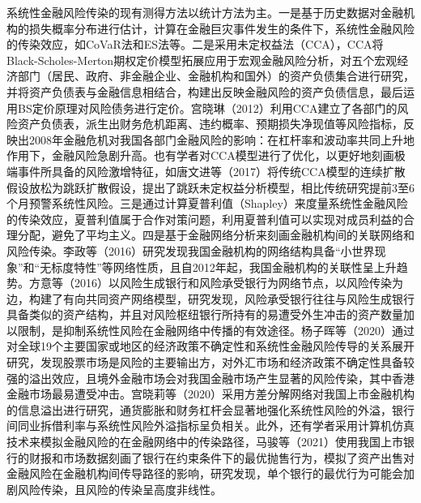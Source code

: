 \documentclass[lang=cn]{elegantpaper}
\begin{document}
系统性金融风险传染的现有测得方法以统计方法为主。一是基于历史数据对金融机构的损失概率分布进行估计，计算在金融巨灾事件发生的条件下，系统性金融风险的传染效应，如CoVaR法和ES法等。二是采用未定权益法（CCA），CCA将Black-Scholes-Merton期权定价模型拓展应用于宏观金融风险分析，对五个宏观经济部门（居民、政府、非金融企业、金融机构和国外）的资产负债集合进行研究，并将资产负债表与金融信息相结合，构建出反映金融风险的资产负债信息，最后运用BS定价原理对风险债务进行定价。宫晓琳（2012）\cite{12}利用CCA建立了各部门的风险资产负债表，派生出财务危机距离、违约概率、预期损失净现值等风险指标，反映出2008年金融危机对我国各部门金融风险的影响：在杠杆率和波动率共同上升地作用下，金融风险急剧升高。也有学者对CCA模型进行了优化，以更好地刻画极端事件所具备的风险激增特征，如唐文进等（2017）\cite{13}将传统CCA模型的连续扩散假设放松为跳跃扩散假设，提出了跳跃未定权益分析模型，相比传统研究提前3至6个月预警系统性风险。三是通过计算夏普利值（Shapley）来度量系统性金融风险的传染效应，夏普利值属于合作对策问题，利用夏普利值可以实现对成员利益的合理分配，避免了平均主义。四是基于金融网络分析来刻画金融机构间的关联网络和风险传染。李政等（2016）\cite{14}研究发现我国金融机构的网络结构具备“小世界现象”和“无标度特性”等网络性质，且自2012年起，我国金融机构的关联性呈上升趋势。方意等（2016）\cite{15}以风险生成银行和风险承受银行为网络节点，以风险传染为边，构建了有向共同资产网络模型，研究发现，风险承受银行往往与风险生成银行具备类似的资产结构，并且对风险枢纽银行所持有的易遭受外生冲击的资产数量加以限制，是抑制系统性风险在金融网络中传播的有效途径。杨子晖等（2020）\cite{16}通过对全球19个主要国家或地区的经济政策不确定性和系统性金融风险传导的关系展开研究，发现股票市场是风险的主要输出方，对外汇市场和经济政策不确定性具备较强的溢出效应，且境外金融市场会对我国金融市场产生显著的风险传染，其中香港金融市场最易遭受冲击。宫晓莉等（2020）\cite{17}采用方差分解网络对我国上市金融机构的信息溢出进行研究，通货膨胀和财务杠杆会显著地强化系统性风险的外溢，银行间同业拆借利率与系统性风险外溢指标呈负相关。此外，还有学者采用计算机仿真技术来模拟金融风险的在金融网络中的传染路径，马骏等（2021）\cite{18}使用我国上市银行的财报和市场数据刻画了银行在约束条件下的最优抛售行为，模拟了资产出售对金融风险在金融机构间传导路径的影响，研究发现，单个银行的最优行为可能会加剧风险传染，且风险的传染呈高度非线性。
\end{document}
